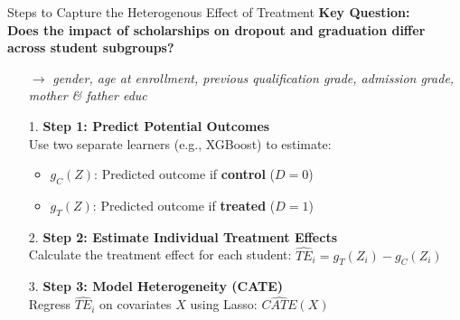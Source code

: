 \documentclass[aspectratio=169]{beamer}
\begin{document}
\begin{frame}{Steps to Capture the Heterogenous Effect of Treatment}
\textbf{Key Question:} \\
\textbf{Does the impact of scholarships on dropout and graduation differ across student subgroups?}
\vspace{-8pt}
\begin{itemize}
	\item [$\rightarrow$]  \textit{gender, age at enrollment, previous qualification grade, admission grade, mother \& father educ}
\end{itemize}

\begin{itemize}
    \item[1.] \textbf{Step 1: Predict Potential Outcomes} \\
    Use two separate learners (e.g., XGBoost) to estimate:
    \begin{itemize}
        \item $g_C(Z)$: Predicted outcome if \textbf{control} ($D=0$)
        \item $g_T(Z)$: Predicted outcome if \textbf{treated} ($D=1$)
    \end{itemize}

    \item[2.] \textbf{Step 2: Estimate Individual Treatment Effects} \\
    Calculate the treatment effect for each student:
    $\widehat{TE}_i = g_T(Z_i) - g_C(Z_i)$

    \item[3.] \textbf{Step 3: Model Heterogeneity (CATE)} \\
    Regress $\widehat{TE}_i$ on covariates $X$ using Lasso: $\widehat{CATE}(X)$
\end{itemize}

    
\end{frame}
\end{document}
